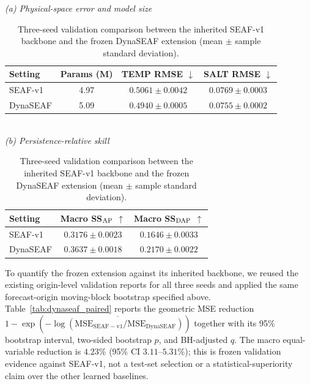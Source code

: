 \documentclass[conference]{IEEEtran}
\begin{document}
\begin{table}[!t]
\centering
\caption{Three-seed validation comparison between the inherited SEAF-v1 backbone and the frozen DynaSEAF extension (mean $\pm$ sample standard deviation).}
\label{tab:incremental}
\scriptsize
\setlength{\tabcolsep}{3.0pt}
\renewcommand{\arraystretch}{1.04}
\textit{(a) Physical-space error and model size}\\[2pt]
\begin{tabular}{lccc}
\toprule
Setting & Params (M) & TEMP RMSE $\downarrow$ & SALT RMSE $\downarrow$\\
\midrule
\rowcolor{seafblue} SEAF-v1 & 4.97 & $0.5061\!\pm\!0.0042$ & $0.0769\!\pm\!0.0003$\\
DynaSEAF & 5.09 & $\mathbf{0.4940\!\pm\!0.0005}$ & $\mathbf{0.0755\!\pm\!0.0002}$\\
\bottomrule
\end{tabular}\\[4pt]
\textit{(b) Persistence-relative skill}\\[2pt]
\begin{tabular}{lcc}
\toprule
Setting & Macro SS$_{\rm AP}$ $\uparrow$ & Macro SS$_{\rm DAP}$ $\uparrow$\\
\midrule
\rowcolor{seafblue} SEAF-v1 & $0.3176\!\pm\!0.0023$ & $0.1646\!\pm\!0.0033$\\
DynaSEAF & $\mathbf{0.3637\!\pm\!0.0018}$ & $\mathbf{0.2170\!\pm\!0.0022}$\\
\bottomrule
\end{tabular}
\end{table}

To quantify the frozen extension against its inherited backbone, we reused the existing origin-level validation reports for all three seeds and applied the same forecast-origin moving-block bootstrap specified above. Table~\ref{tab:dynaseaf_paired} reports the geometric MSE reduction $1-\exp\!\left(-\overline{\log\!\left(\mathrm{MSE}_{\mathrm{SEAF-v1}}/\mathrm{MSE}_{\mathrm{DynaSEAF}}\right)}\right)$ together with its 95\% bootstrap interval, two-sided bootstrap $p$, and BH-adjusted $q$. The macro equal-variable reduction is $4.23\%$ (95\% CI $3.11$--$5.31\%$); this is frozen validation evidence against SEAF-v1, not a test-set selection or a statistical-superiority claim over the other learned baselines.
\end{document}
